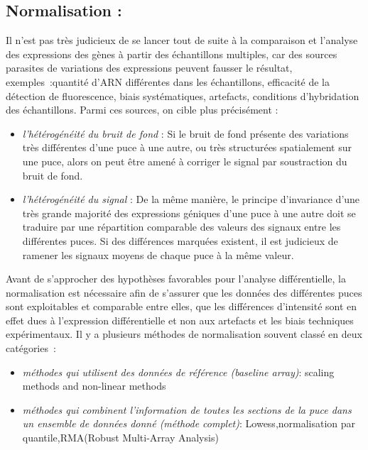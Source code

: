 \documentclass[a4paper,10pt]{article}
\begin{document}
\subsection{Normalisation :}
Il n’est pas très judicieux de se lancer tout de suite à la comparaison et l’analyse des expressions des gènes à partir des échantillons multiples, car des sources parasites de variations des expressions peuvent fausser le résultat, exemples :quantité d’ARN différentes dans les échantillons, efficacité de la détection 
de fluorescence, biais systématiques, artefacts, conditions d’hybridation des échantillons.
Parmi ces sources, on cible plus précisément :
\begin{itemize}
 \item \emph{l’hétérogénéité du bruit de fond} :
 Si le bruit de fond présente des variations très différentes d’une puce à une autre, ou très structurées spatialement sur une puce, alors on peut être amené à corriger le signal par soustraction du bruit de fond. 
 \item \emph{l’hétérogénéité du signal} :
 De la même manière, le principe d’invariance d’une très grande majorité des expressions géniques d’une puce à une autre doit se traduire par une répartition comparable des valeurs des signaux entre les différentes puces. Si des différences marquées existent, il est judicieux de ramener les signaux moyens de chaque puce à la même valeur.
\end{itemize}
Avant de s’approcher des hypothèses favorables pour l’analyse différentielle, la normalisation est nécessaire afin de s’assurer que les données des différentes puces sont exploitables et comparable entre elles, que les différences d’intensité sont en effet dues à l’expression différentielle et non aux artefacts et les biais techniques expérimentaux.
Il y a plusieurs méthodes de normalisation souvent classé en deux catégories :
\begin{itemize}
 \item \emph{méthodes qui utilisent des données de référence (baseline array)}: scaling methods and non-linear methods
 \item \emph{méthodes qui combinent l’information de toutes les sections de la puce dans un ensemble de données donné (méthode complet)}: Lowess,normalisation par quantile,RMA(Robust Multi-Array Analysis)
\end{itemize}

\end{document}
